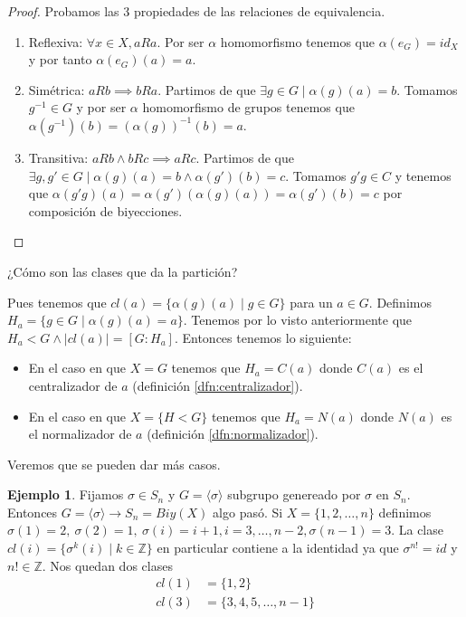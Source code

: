 \documentclass{book}
\theoremstyle{definition}
\newtheorem{ej}{Ejemplo}
\theoremstyle{remark}
\newcommand{\inv}[1]{#1^{-1}}
\newcommand{\Z}{\mathbb{Z}}
\begin{document}
\begin{proof}Probamos las 3 propiedades de las relaciones de equivalencia.
	\begin{enumerate}
		\item Reflexiva: $\forall x \in X, a R a$. Por ser $\alpha$ homomorfismo tenemos que $\alpha(e_G) = id_X$ y por tanto $\alpha(e_G)(a) = a$.
		\item Simétrica: $aRb \implies bRa$. Partimos de que $\exists g \in G \mid \alpha(g)(a) = b$. Tomamos $\inv{g} \in G$ y por ser $\alpha$ homomorfismo de grupos tenemos que $\alpha(\inv{g})(b) = \inv{(\alpha(g))}(b) = a$.
		\item Transitiva: $aRb \land bRc \implies aRc$. Partimos de que $\exists g, g' \in G \mid \alpha(g)(a) = b \land \alpha(g')(b) = c$. Tomamos $g'g \in C$ y tenemos que $\alpha(g'g)(a) = \alpha(g')(\alpha(g)(a)) = \alpha(g')(b) = c$ por composición de biyecciones.
	\end{enumerate}
\end{proof}

¿Cómo son las clases que da la partición?

Pues tenemos que $cl(a) = \{\alpha(g)(a) \mid g \in G\}$ para un $a \in G$. Definimos $H_a = \{g \in G \mid \alpha(g)(a) = a\}$. Tenemos por lo visto anteriormente que $H_a < G \land |cl(a)| = [G:H_a]$. Entonces tenemos lo siguiente:
\begin{itemize}
	\item En el caso en que $X = G$ tenemos que $H_a = C(a)$ donde $C(a)$ es el centralizador de $a$ (definición \ref{dfn:centralizador}).
	\item En el caso en que $X = \{H < G\}$ tenemos que $H_a = N(a)$ donde $N(a)$ es el normalizador de $a$ (definición \ref{dfn:normalizador}).
\end{itemize}
Veremos que se pueden dar más casos.

\begin{ej}
	Fijamos $\sigma \in S_n$ y $G = \langle \sigma \rangle$ subgrupo genereado por $\sigma$ en $S_n$. Entonces $G = \langle \sigma \rangle \to S_n = Biy(X)$ algo pasó. Si $X = \{1, 2, \dots, n\}$ definimos $\sigma(1) = 2,\ \sigma(2) = 1,\ \sigma(i) = i+1, i = 3,\dots, n-2,\sigma(n-1) = 3$. La clase $cl(i) = \{\sigma^k(i) \mid k \in \Z\}$ en particular contiene a la identidad ya que $\sigma^{n!} = id$ y $n! \in \Z$. Nos quedan dos clases
	\begin{align*}
		cl(1) &= \{1, 2\} \\
		cl(3) &= \{3, 4, 5, \dots, n - 1\}
	\end{align*}
\end{ej}
\end{document}
